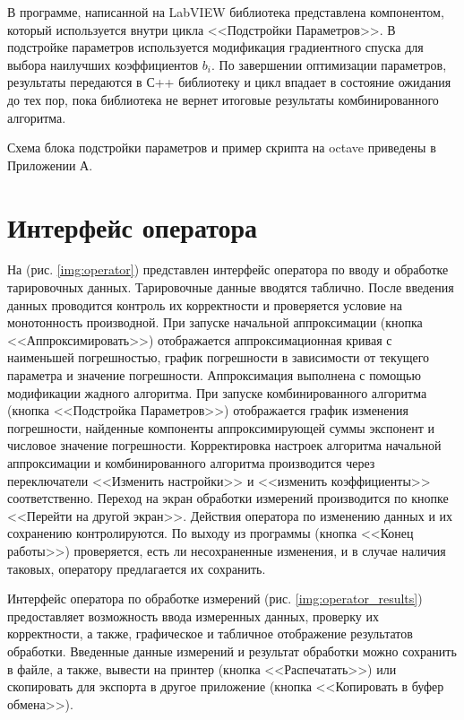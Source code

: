В программе, написанной на LabVIEW библиотека представлена 
компонентом, который используется внутри цикла <<Подстройки 
Параметров>>. В подстройке параметров используется модификация 
градиентного спуска для выбора наилучших коэффициентов $b_i$. По 
завершении оптимизации параметров, результаты передаются в С++ 
библиотеку и цикл впадает в состояние ожидания до тех пор, пока 
библиотека не вернет итоговые результаты комбинированного алгоритма.

Схема блока подстройки параметров и пример скрипта на octave приведены в Приложении А.
\clearpage
\section{Интерфейс оператора}
На (рис. \ref{img:operator}) представлен интерфейс оператора по вводу и обработке тарировочных данных. 
Тарировочные данные вводятся таблично. После введения данных 
проводится контроль их корректности и проверяется условие на 
монотонность производной.  
При запуске начальной аппроксимации (кнопка <<Аппроксимировать>>) 
отображается аппроксимационная 
кривая с наименьшей погрешностью, график погрешности в зависимости 
от текущего параметра и 
значение погрешности. Аппроксимация выполнена с помощью модификации 
жадного алгоритма.
При запуске комбинированного алгоритма (кнопка <<Подстройка Параметров>>) 
отображается график изменения погрешности, найденные 
компоненты аппроксимирующей суммы экспонент и числовое значение погрешности. 
Корректировка настроек алгоритма начальной аппроксимации и комбинированного алгоритма производится через 
переключатели <<Изменить настройки>> и <<изменить коэффициенты>> соответственно. Переход на экран 
обработки измерений производится по кнопке <<Перейти на другой экран>>. Действия оператора по изменению 
данных и их сохранению контролируются. По выходу из программы (кнопка <<Конец работы>>) проверяется, 
есть ли несохраненные изменения, и в случае наличия таковых, оператору предлагается их сохранить.
 



Интерфейс оператора по обработке измерений (рис. \ref{img:operator_results}) предоставляет возможность ввода измеренных данных,
 проверку их корректности, а также, графическое и табличное отображение результатов обработки.
 Введенные данные измерений и результат обработки  можно сохранить в файле, а также,
 вывести на принтер (кнопка <<Распечатать>>) или скопировать для экспорта в другое приложение (кнопка <<Копировать в буфер обмена>>).






